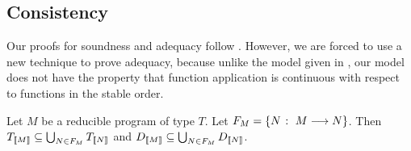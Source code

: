 \documentclass{entcs} \usepackage{prentcsmacro}
\newcommand{\opto}{\longrightarrow}
\newcommand{\0}{{\mathtt{0}}}
\begin{document}
\subsection{Consistency}

Our proofs for soundness and adequacy follow \cite{LairdOrdinalGames}.  However, we are forced to use a new technique to prove adequacy, because unlike the model given in \cite{LairdOrdinalGames}, our model does not have the property that function application is continuous with respect to functions in the stable order.

\begin{lemma}
  \label{jimsLemma}
  Let $M$ be a reducible program of type $T$.  Let $F_M = \{N\suchthat M\opto N\}$.  Then $T_{\left\llbracket M\right\rrbracket}\subseteq\bigcup_{N\in F_M} T_{\left\llbracket N\right\rrbracket}$ and $D_{\left\llbracket M\right\rrbracket}\subseteq \bigcup_{N\in F_M} D_{\left\llbracket N\right\rrbracket}$.
\end{lemma}
\end{document}
